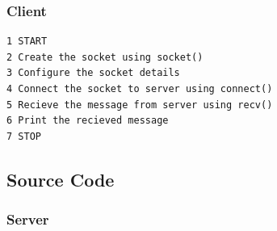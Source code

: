 \subsubsection{Client}
\begin{verbatim}
1 START
2 Create the socket using socket()
3 Configure the socket details
4 Connect the socket to server using connect()
5 Recieve the message from server using recv()
6 Print the recieved message
7 STOP
\end{verbatim}

\subsection{Source Code}
\subsubsection{Server}
